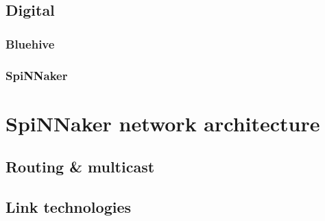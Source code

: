 		\subsection{Digital}
			
			
			\subsubsection{Bluehive}
				
			
			\subsubsection{SpiNNaker}
				
	
	
	\section{SpiNNaker network architecture}
		\label{sec:spinnaker}
		
		
		\subsection{Routing \& multicast}
			
		
		\subsection{Link technologies}
			
	
